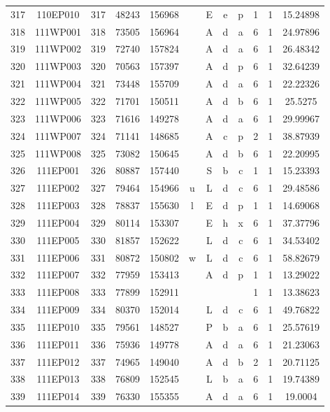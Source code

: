 \begin{tabular}{|*{12}{c|}}
317 & 110EP010 & 317 & 48243 & 156968 &  & E & e & p & 1 & 1 & 15.24898 \\ 
318 & 111WP001 & 318 & 73505 & 156964 &  & A & d & a & 6 & 1 & 24.97896 \\ 
319 & 111WP002 & 319 & 72740 & 157824 &  & A & d & a & 6 & 1 & 26.48342 \\ 
320 & 111WP003 & 320 & 70563 & 157397 &  & A & d & p & 6 & 1 & 32.64239 \\ 
321 & 111WP004 & 321 & 73448 & 155709 &  & A & d & a & 6 & 1 & 22.22326 \\ 
322 & 111WP005 & 322 & 71701 & 150511 &  & A & d & b & 6 & 1 & 25.5275 \\ 
323 & 111WP006 & 323 & 71616 & 149278 &  & A & d & a & 6 & 1 & 29.99967 \\ 
324 & 111WP007 & 324 & 71141 & 148685 &  & A & c & p & 2 & 1 & 38.87939 \\ 
325 & 111WP008 & 325 & 73082 & 150645 &  & A & d & b & 6 & 1 & 22.20995 \\ 
326 & 111EP001 & 326 & 80887 & 157440 &  & S & b & c & 1 & 1 & 15.23393 \\ 
327 & 111EP002 & 327 & 79464 & 154966 & u & L & d & c & 6 & 1 & 29.48586 \\ 
328 & 111EP003 & 328 & 78837 & 155630 & l & E & d & p & 1 & 1 & 14.69068 \\ 
329 & 111EP004 & 329 & 80114 & 153307 &  & E & h & x & 6 & 1 & 37.37796 \\ 
330 & 111EP005 & 330 & 81857 & 152622 &  & L & d & c & 6 & 1 & 34.53402 \\ 
331 & 111EP006 & 331 & 80872 & 150802 & w & L & d & c & 6 & 1 & 58.82679 \\ 
332 & 111EP007 & 332 & 77959 & 153413 &  & A & d & p & 1 & 1 & 13.29022 \\ 
333 & 111EP008 & 333 & 77899 & 152911 &  &  &  &  & 1 & 1 & 13.38623 \\ 
334 & 111EP009 & 334 & 80370 & 152014 &  & L & d & c & 6 & 1 & 49.76822 \\ 
335 & 111EP010 & 335 & 79561 & 148527 &  & P & b & a & 6 & 1 & 25.57619 \\ 
336 & 111EP011 & 336 & 75936 & 149778 &  & A & d & a & 6 & 1 & 21.23063 \\ 
337 & 111EP012 & 337 & 74965 & 149040 &  & A & d & b & 2 & 1 & 20.71125 \\ 
338 & 111EP013 & 338 & 76809 & 152545 &  & L & b & a & 6 & 1 & 19.74389 \\ 
339 & 111EP014 & 339 & 76330 & 155355 &  & A & d & a & 6 & 1 & 19.0004 \\ 

\end{tabular}
